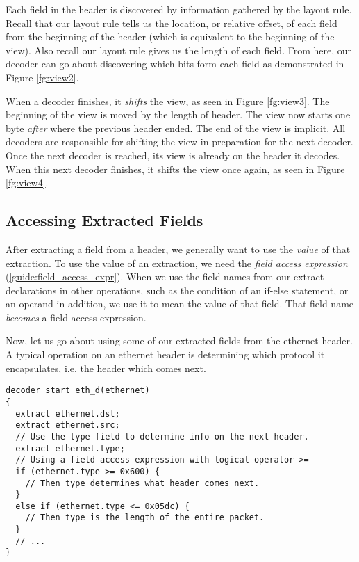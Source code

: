 Each field in the header is discovered by information gathered by the layout rule. Recall that our layout rule tells us the location, or relative offset, of each field from the beginning of the header (which is equivalent to the beginning of the view). Also recall our layout rule gives us the length of each field. From here, our decoder can go about discovering which bits form each field as demonstrated in Figure \ref{fg:view2}.

When a decoder finishes, it \textit{shifts} the view, as seen in Figure \ref{fg:view3}. The beginning of the view is moved by the length of header. The view now starts one byte \textit{after} where the previous header ended. The end of the view is implicit. All decoders are responsible for shifting the view in preparation for the next decoder. Once the next decoder is reached, its view is already on the header it decodes. When this next decoder finishes, it shifts the view once again, as seen in Figure \ref{fg:view4}.

\subsection{Accessing Extracted Fields} \label{tut:decoder_access}

After extracting a field from a header, we generally want to use the \textit{value} of that extraction. To use the value of an extraction, we need the \textit{field access expression} (\ref{guide:field_access_expr}). When we use the field names from our extract declarations in other operations, such as the condition of an if-else statement, or an operand in addition, we use it to mean the value of that field. That field name \textit{becomes} a field access expression.

Now, let us go about using some of our extracted fields from the ethernet header. A typical operation on an ethernet header is determining which protocol it encapsulates, i.e. the header which comes next.

\begin{codepage}
\begin{lstlisting}
decoder start eth_d(ethernet)
{
  extract ethernet.dst;
  extract ethernet.src;
  // Use the type field to determine info on the next header.
  extract ethernet.type;
  // Using a field access expression with logical operator >=
  if (ethernet.type >= 0x600) {
    // Then type determines what header comes next.
  }
  else if (ethernet.type <= 0x05dc) {
    // Then type is the length of the entire packet.
  }
  // ...
}
\end{lstlisting}
\end{codepage}

